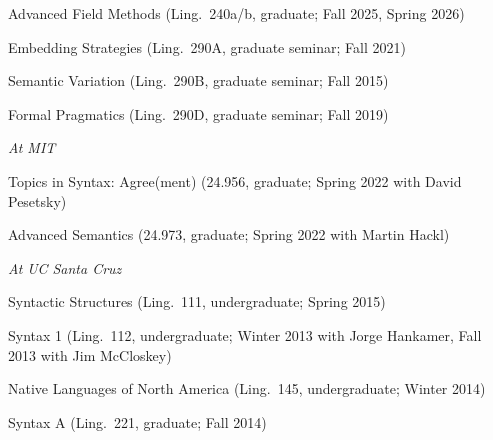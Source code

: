 \documentclass[12pt]{article}
\begin{document}
\ind Advanced Field Methods (Ling.~240a/b, graduate; Fall 2025, Spring 2026)

\ind Embedding Strategies (Ling.~290A, graduate seminar; Fall 2021)

\ind Semantic Variation (Ling.~290B, graduate seminar; Fall 2015)

\ind Formal Pragmatics (Ling.~290D, graduate seminar; Fall 2019)


\medskip

\noindent\emph{At MIT\vspace{0.05in}}

\ind Topics in Syntax: Agree(ment) (24.956, graduate; Spring 2022 with David Pesetsky)

\ind Advanced Semantics (24.973, graduate; Spring 2022 with Martin Hackl)

\medskip

\noindent\emph{At UC Santa Cruz\vspace{0.05in}}

\ind Syntactic Structures (Ling.~111, undergraduate; Spring 2015)

\ind Syntax 1 (Ling.~112, undergraduate; Winter 2013 with Jorge Hankamer, Fall 2013 with Jim McCloskey)

\ind Native Languages of North America (Ling.~145, undergraduate; Winter 2014)

\ind Syntax A (Ling.~221, graduate; Fall 2014)
\end{document}
